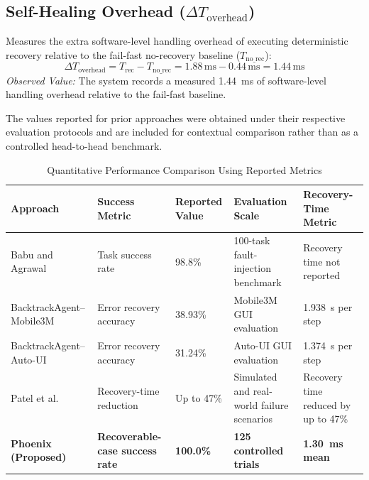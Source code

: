\documentclass[conference]{IEEEtran}
\begin{document}
\subsection{Self-Healing Overhead ($\Delta T_{\text{overhead}}$)}
Measures the extra software-level handling overhead of executing deterministic recovery relative to the fail-fast no-recovery baseline ($T_{\text{no\_rec}}$):
\begin{equation}
\Delta T_{\text{overhead}} = T_{\text{rec}} - T_{\text{no\_rec}} = 1.88\,\text{ms} - 0.44\,\text{ms} = 1.44\,\text{ms}
\end{equation}
\textit{Observed Value:} The system records a measured 1.44~ms of software-level handling overhead relative to the fail-fast baseline.

The values reported for prior approaches were obtained under their respective evaluation protocols and are included for contextual comparison rather than as a controlled head-to-head benchmark.

\begin{table}[t]
\centering
\caption{Quantitative Performance Comparison Using Reported Metrics}
\label{tab:performance_comparison}
\footnotesize
\begin{tabularx}{\textwidth}{p{}p{}p{}p{}X}
\toprule
\textbf{Approach} & \textbf{Success Metric} & \textbf{Reported Value} & \textbf{Evaluation Scale} & \textbf{Recovery-Time Metric} \\
\midrule
Babu and Agrawal~\cite{babu2026} & Task success rate & 98.8\% & 100-task fault-injection benchmark & Recovery time not reported \\
BacktrackAgent--Mobile3M~\cite{wu2025} & Error recovery accuracy & 38.93\% & Mobile3M GUI evaluation & 1.938~s per step \\
BacktrackAgent--Auto-UI~\cite{wu2025} & Error recovery accuracy & 31.24\% & Auto-UI GUI evaluation & 1.374~s per step \\
Patel et al.~\cite{patel2026b} & Recovery-time reduction & Up to 47\% & Simulated and real-world failure scenarios & Recovery time reduced by up to 47\% \\
\textbf{Phoenix (Proposed)} & \textbf{Recoverable-case success rate} & \textbf{100.0\%} & \textbf{125 controlled trials} & \textbf{1.30~ms mean} \\
\bottomrule
\end{tabularx}
\end{table}
\end{document}
